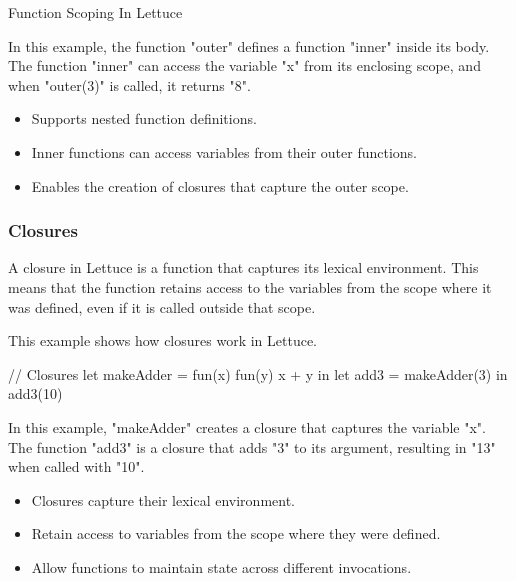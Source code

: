 \begin{notes}{Function Scoping In Lettuce}
\begin{highlight}
        In this example, the function "outer" defines a function "inner" inside its body. The function "inner" can access the variable "x" from its enclosing scope, and when "outer(3)" is called, it returns "8".
    
        \begin{itemize}
            \item Supports nested function definitions.
            \item Inner functions can access variables from their outer functions.
            \item Enables the creation of closures that capture the outer scope.
        \end{itemize}
    
    \end{highlight}
    
    \subsubsection*{Closures}
    
    A closure in Lettuce is a function that captures its lexical environment. This means that the function retains access to the variables from the scope where it was defined, even if it is called outside that scope.
    
    \begin{highlight}[Closures]
    
        This example shows how closures work in Lettuce.
    
    \begin{code}[Lettuce]
    // Closures
    let makeAdder = fun(x) {
        fun(y) { x + y }
    } in
    let add3 = makeAdder(3) in
    add3(10)
    \end{code}
    
        In this example, "makeAdder" creates a closure that captures the variable "x". The function "add3" is a closure that adds "3" to its argument, resulting in "13" when called with "10".
    
        \begin{itemize}
            \item Closures capture their lexical environment.
            \item Retain access to variables from the scope where they were defined.
            \item Allow functions to maintain state across different invocations.
        \end{itemize}
    

\end{highlight}
\end{notes}

